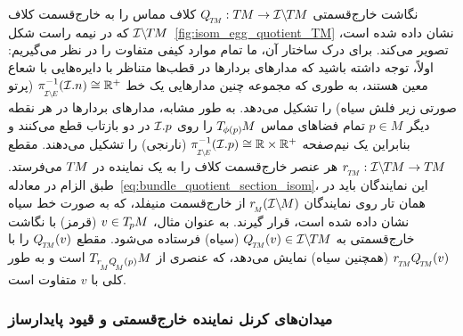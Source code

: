 نگاشت خارج‌قسمتی $\QTM: \TM \to \ITM$ کلاف مماس را به خارج‌قسمت کلاف $\mathcal{I}\backslash\mkern-1.5mu T\mkern-1.5mu M$ که در نیمه راست شکل~\ref{fig:isom_egg_quotient_TM} نشان داده شده است، تصویر می‌کند.
برای درک ساختار آن، ما تمام موارد کیفی متفاوت را در نظر می‌گیریم:
اولاً، توجه داشته باشید که مدارهای بردارها در قطب‌ها متناظر با دایره‌هایی با شعاع معین هستند، به طوری که مجموعه چنین مدارهایی یک خط $\piIE^{-1}(\I.n) \cong \R^+$ (پرتو صورتی زیر فلش سیاه) را تشکیل می‌دهد.
به طور مشابه، مدارهای بردارها در هر نقطه دیگر $p\in M$ تمام فضاهای مماس $T_{\mkern-1.5mu \phi(p)}\mkern-1muM$ را روی $\mathcal{I}.p$ در دو بازتاب قطع می‌کنند و بنابراین یک نیم‌صفحه $\piIE^{-1}(\I.p) \cong \R\times\R^+$ (نارنجی) را تشکیل می‌دهند.
مقطع $\rTM: \ITM \to \TM$ هر عنصر خارج‌قسمت کلاف را به یک نماینده در $T\mkern-1.5muM$ می‌فرستد.
طبق الزام در معادله~\eqref{eq:bundle_quotient_section_isom}، این نمایندگان باید در همان تار روی نمایندگان $\rM(\IM)$ از خارج‌قسمت منیفلد، که به صورت خط سیاه نشان داده شده است، قرار گیرند.
به عنوان مثال، $v\in T_{\mkern-1.5mu p}\mkern-.5muM$ (قرمز) با نگاشت خارج‌قسمتی به $\QTM(v)\in \ITM$ (سیاه) فرستاده می‌شود.
مقطع $\QTM(v)$ را با $\rTM\QTM(v)$ (همچنین سیاه) نمایش می‌دهد، که عنصری از $T_{\rM\QM(p)}M$ است و به طور کلی با $v$ متفاوت است.



















\subsubsection{میدان‌های کرنل نماینده خارج‌قسمتی و قیود پایدارساز}
\label{sec:quotient_kernels_stabilizers}


